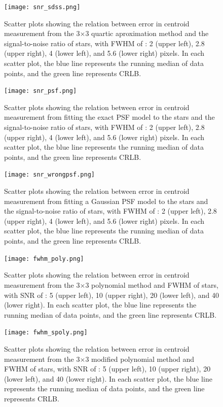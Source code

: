 \documentclass[12pt, preprint]{aastex}
\begin{document}
\begin{figure}[!htb]
  \texttt{[image: snr\_sdss.png]}
\endminipage
\caption{Scatter plots showing the relation between error in centroid measurement from the 3$\times$3 quartic aproximation method and the signal-to-noise ratio of stars, with FWHM of : 2 (upper left), 2.8 (upper right), 4 (lower left), and 5.6 (lower right) pixels. In each scatter plot, the blue line represents the running median of data points, and the green line represents CRLB.}\label{3}
\end{figure}

\begin{figure}[!htb]
  \texttt{[image: snr\_psf.png]}
\endminipage
\caption{Scatter plots showing the relation between error in centroid measurement from fitting the exact PSF model to the stars and the signal-to-noise ratio of stars, with FWHM of : 2 (upper left), 2.8 (upper right), 4 (lower left), and 5.6 (lower right) pixels. In each scatter plot, the blue line represents the running median of data points, and the green line represents CRLB.}\label{4}
\end{figure}

\begin{figure}[!htb]
  \texttt{[image: snr\_wrongpsf.png]}
\endminipage
\caption{Scatter plots showing the relation between error in centroid measurement from fitting a Gaussian PSF model to the stars and the signal-to-noise ratio of stars, with FWHM of : 2 (upper left), 2.8 (upper right), 4 (lower left), and 5.6 (lower right) pixels. In each scatter plot, the blue line represents the running median of data points, and the green line represents CRLB.}\label{5}
\end{figure}

\begin{figure}[!htb]
  \texttt{[image: fwhm\_poly.png]}
\endminipage
\caption{Scatter plots showing the relation between error in centroid measurement from the 3$\times$3 polynomial method and FWHM of stars, with SNR  of : 5 (upper left), 10 (upper right), 20 (lower left), and 40 (lower right). In each scatter plot, the blue line represents the running median of data points, and the green line represents CRLB.}\label{6}
\end{figure}

\begin{figure}[!htb]
  \texttt{[image: fwhm\_spoly.png]}
\endminipage
\caption{Scatter plots showing the relation between error in centroid measurement from the 3$\times$3 modified polynomial method and FWHM of stars, with SNR  of : 5 (upper left), 10 (upper right), 20 (lower left), and 40 (lower right). In each scatter plot, the blue line represents the running median of data points, and the green line represents CRLB.}\label{7}
\end{figure}
\end{document}
